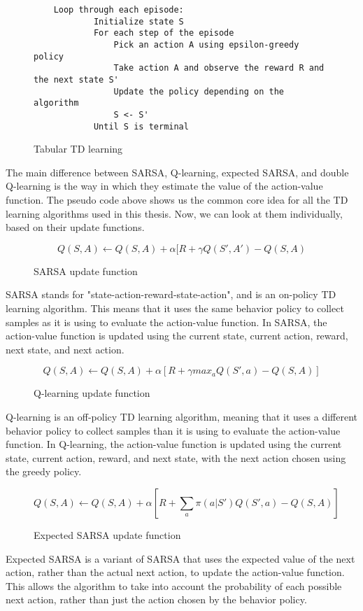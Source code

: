 \begin{figure}[h]
    \centering
    \begin{lstlisting}
    Loop through each episode:
    		Initialize state S
    		For each step of the episode
    			Pick an action A using epsilon-greedy policy
    			Take action A and observe the reward R and the next state S' 
    			Update the policy depending on the algorithm
    			S <- S'
    		Until S is terminal
	\end{lstlisting}
    \caption{Tabular TD learning}
    \label{algo:TD}
\end{figure}

The main difference between SARSA, Q-learning, expected SARSA, and double Q-learning is the way in which they estimate the value of the action-value function. The pseudo code above shows us the common core idea for all the TD learning algorithms used in this thesis. Now, we can look at them individually, based on their update functions.
\begin{figure}[h]
    \centering
   $$Q(S,A) \leftarrow Q(S,A) + \alpha [R + \gamma Q(S',A') - Q(S,A)$$
    \caption{SARSA update function}
    \label{algo:S}
\end{figure}
SARSA stands for "state-action-reward-state-action", and is an on-policy TD learning algorithm. This means that it uses the same behavior policy to collect samples as it is using to evaluate the action-value function. In SARSA, the action-value function is updated using the current state, current action, reward, next state, and next action.
\begin{figure}[h]
    \centering
    $$Q(S,A) \leftarrow Q(S,A) + \alpha [R + \gamma {max}_a Q(S',a) - Q(S,A)]$$
    \caption{Q-learning update function}
    \label{algo:QL}
\end{figure}
Q-learning is an off-policy TD learning algorithm, meaning that it uses a different behavior policy to collect samples than it is using to evaluate the action-value function. In Q-learning, the action-value function is updated using the current state, current action, reward, and next state, with the next action chosen using the greedy policy.
\begin{figure}[h]
    \centering
    $$Q(S,A) \leftarrow Q(S,A) + \alpha [R + \sum_a \pi (a|S') Q(S',a) - Q(S,A)]$$
    \caption{Expected SARSA update function}
    \label{algo:ES}
\end{figure}
Expected SARSA is a variant of SARSA that uses the expected value of the next action, rather than the actual next action, to update the action-value function. This allows the algorithm to take into account the probability of each possible next action, rather than just the action chosen by the behavior policy.
